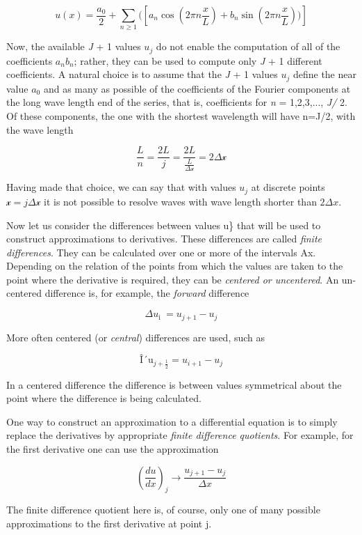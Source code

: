 \[u( x ) = \frac{a_{0}}{2} + \sum_{n \geq 1}(\left[  a_{n}  \cos\left(2\pi n \frac{x}{L}\right)
+ b_{n}   \sin\left(2\pi n \frac{x}{L} \right))\right]\]

Now, the available \emph{J} + 1 values \(u_j\) do not enable the
computation of all of the coefficients \(a_{n}b_{n}\); rather, they can
be used to compute only \emph{J} + 1 different coefficients. A natural
choice is to assume that the \emph{J} + 1 values \(u_j\) define the near
value \(a_{0}\) and as many as possible of the coefficients of the
Fourier components at the long wave length end of the series, that is,
coefficients for \emph{n} = 1,2,3,..., \emph{J/} 2. Of these components,
the one with the shortest wavelength will have n=J/2, with the wave
length

\[\frac{L}{n} =  \frac{2L}{j} =  \frac{2L}{\frac{L}{\Delta\mathcal{x}}} = 2\Delta\mathcal{x}\]

Having made that choice, we can say that with values \(u_{j}\) at
discrete points \(\mathcal{x =}j\Delta\mathcal{x}\) it is not possible
to resolve waves with wave length shorter than $2 \Delta x$.

Now let us consider the differences between values u\} that will be used
to construct approximations to derivatives. These differences are
called \emph{finite differences}. They can be calculated over one or
more of the intervals Ax. Depending on the relation of the points from
which the values are taken to the point where the derivative is
required, they can be \emph{centered or uncentered}. An un-centered
difference is, for example, the \emph{forward} difference

\[\Delta u_{\text{i }} = u_{j + 1}  - u_{j}\]

More often centered (or \emph{central}) differences are used, such as

\[\text{Î´u}_{j + \frac{1}{2}} =  u_{i + 1} -  u_{j}\]

In a centered difference the difference is between values symmetrical
about the point where the difference is being calculated.

One way to construct an approximation to a differential equation is to
simply replace the derivatives by appropriate \emph{finite difference
quotients}. For example, for the first derivative one can use the
approximation

    \[\left( \frac{d u}{d x } \right)_j \to \frac{u_{j + 1} - u_{j}}{\Delta x}\]

The finite difference quotient here is, of course, only one of many
possible approximations to the first derivative at point j.

